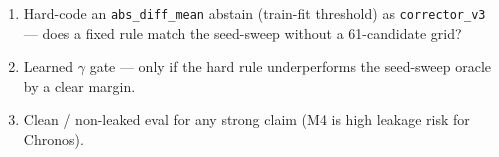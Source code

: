 \begin{enumerate}
  \item Hard-code an \texttt{abs\_diff\_mean} abstain (train-fit threshold) as
        \texttt{corrector\_v3} --- does a fixed rule match the seed-sweep
        without a 61-candidate grid?
  \item Learned $\gamma$ gate --- only if the hard rule underperforms the
        seed-sweep oracle by a clear margin.
  \item Clean / non-leaked eval for any strong claim (M4 is high leakage risk
        for Chronos).
\end{enumerate}

